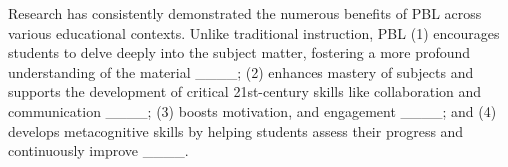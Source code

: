 Research has consistently demonstrated the numerous benefits of PBL across various educational contexts. Unlike traditional instruction, PBL (1) encourages students to delve deeply into the subject matter, fostering a more profound understanding of the material ____; (2) enhances mastery of subjects and supports the development of critical 21st-century skills like collaboration and communication ____; (3) boosts motivation, and engagement ____; %
and (4) develops metacognitive skills by helping students assess their progress and continuously improve ____. %




